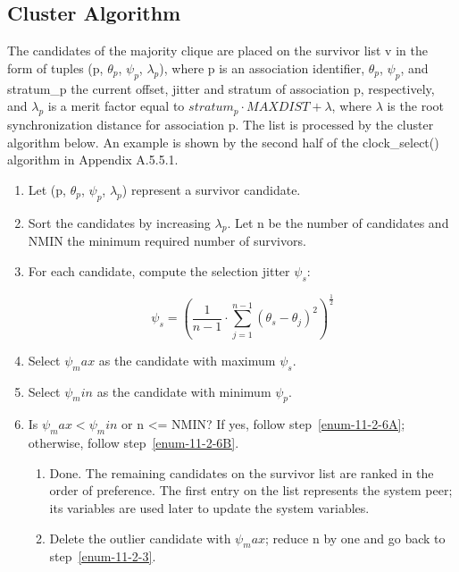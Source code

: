 \subsection{Cluster Algorithm}
\label{section-11-2-2}

The candidates of the majority clique are placed on the survivor list
v in the form of tuples (p, $ \theta_p $, $ \psi_p $, $ \lambda_p $), where p is an
association identifier, $ \theta_p $, $ \psi_p $, and stratum\_p the current
offset, jitter and stratum of association p, respectively, and
$ \lambda_p $ is a merit factor equal to $ stratum_p \cdot MAXDIST + \lambda $,
where $ \lambda $ is the root synchronization distance for association p.
The list is processed by the cluster algorithm below. An example is
shown by the second half of the clock\_select() algorithm in
Appendix A.5.5.1.

\begin{enumerate}
  \item Let (p, $ \theta_p $, $ \psi_p $, $ \lambda_p $) represent a survivor candidate.

  \item Sort the candidates by increasing $ \lambda_p $. Let n be the number
    of candidates and NMIN the minimum required number of survivors.

  \item \label{enum-11-2-3} For each candidate, compute the selection jitter $ \psi_s $:

    $$
    \psi_s = \left( \frac{1}{n - 1} \cdot \sum^{n - 1}_{j = 1} (\theta_s - \theta_j)^2 \right)^{\frac{1}{2}}
    $$

  \item Select $ \psi_max $ as the candidate with maximum $ \psi_s $.
  \item Select $ \psi_min $ as the candidate with minimum $ \psi_p $.

  \item \label{enum-11-2-6} Is $ \psi_max < \psi_min $ or n <= NMIN? If yes, follow step~\ref{enum-11-2-6A};
    otherwise, follow step~\ref{enum-11-2-6B}.

    \begin{enumerate}
      \item \label{enum-11-2-6A} Done. The remaining candidates on the survivor list are ranked
      in the order of preference. The first entry on the list represents
      the system peer; its variables are used later to update the system
      variables.

      \item \label{enum-11-2-6B} Delete the outlier candidate with $ \psi_max $; reduce n by one and go
      back to step~\ref{enum-11-2-3}.
    \end{enumerate}
\end{enumerate}


